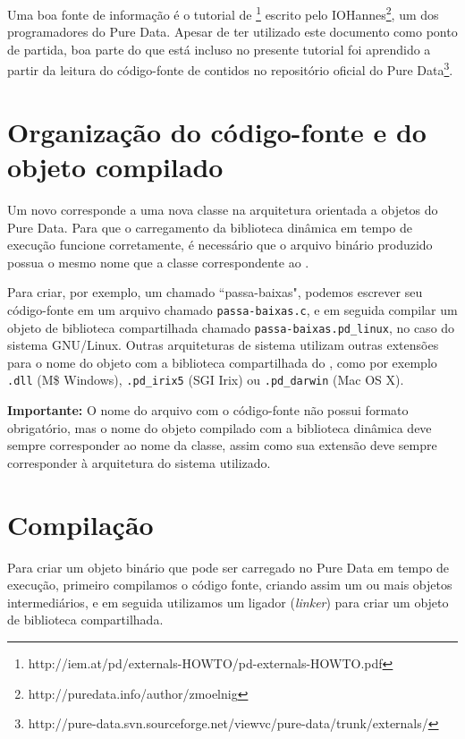 Uma boa fonte de informação é o tutorial de
\externals\footnote{http://iem.at/pd/externals-HOWTO/pd-externals-HOWTO.pdf}
escrito pelo IOHannes\footnote{http://puredata.info/author/zmoelnig}, um dos
programadores do Pure Data. Apesar de ter utilizado este documento como ponto
de partida, boa parte do que está incluso no presente tutorial foi aprendido a
partir da leitura do código-fonte de \externals contidos no repositório
oficial do Pure
Data\footnote{http://pure-data.svn.sourceforge.net/viewvc/pure-data/trunk/externals/}.

\section{Organização do código-fonte e do objeto compilado}
\label{sec:organizacao}

Um novo \external corresponde a uma nova classe na arquitetura orientada a
objetos do Pure Data. Para que o carregamento da biblioteca dinâmica
em tempo de execução funcione corretamente, é necessário que o
arquivo binário produzido possua o mesmo nome que a classe correspondente ao
\external.

Para criar, por exemplo, um \external chamado ``passa-baixas", podemos
escrever seu código-fonte em um arquivo chamado \texttt{passa-baixas.c}, e em
seguida compilar um objeto de biblioteca compartilhada chamado
\texttt{passa-baixas.pd\_linux}, no caso do sistema GNU/Linux. Outras
arquiteturas de sistema utilizam outras extensões para o nome do objeto com a
biblioteca compartilhada do \external, como por exemplo \texttt{.dll} (M\$
Windows), \texttt{.pd\_irix5} (SGI Irix) ou \texttt{.pd\_darwin} (Mac OS X).

\textbf{Importante:} O nome do arquivo com o código-fonte não possui formato
obrigatório, mas o nome do objeto compilado com a biblioteca dinâmica deve
sempre corresponder ao nome da classe, assim como sua extensão deve sempre
corresponder à arquitetura do sistema utilizado.

\section{Compilação}
\label{sec:compiling}

Para criar um objeto binário que pode ser carregado no Pure Data em tempo de
execução, primeiro compilamos o código fonte, criando assim um ou mais objetos
intermediários, e em seguida utilizamos um ligador (\emph{linker}) para criar
um objeto de biblioteca compartilhada.

